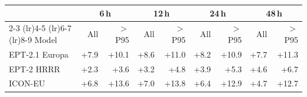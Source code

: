 \begin{tabular}{@{}l*{8}{r}@{}}
\toprule
& \multicolumn{2}{c}{6\,h} & \multicolumn{2}{c}{12\,h} & \multicolumn{2}{c}{24\,h} & \multicolumn{2}{c}{48\,h} \\
\cmidrule(lr){2-3} \cmidrule(lr){4-5} \cmidrule(lr){6-7} \cmidrule(lr){8-9}
Model & All & $>$P95 & All & $>$P95 & All & $>$P95 & All & $>$P95 \\
\midrule
EPT-2.1 Europa & +7.9 & +10.1 & +8.6 & +11.0 & +8.2 & +10.9 & +7.7 & +11.3 \\\addlinespace[0.3em]
EPT-2 HRRR & +2.3 & +3.6 & +3.2 & +4.8 & +3.9 & +5.3 & +4.6 & +6.7 \\\addlinespace[0.3em]
ICON-EU & +6.8 & +13.6 & +7.0 & +13.8 & +6.4 & +12.9 & +4.7 & +12.7 \\
\bottomrule
\end{tabular}
